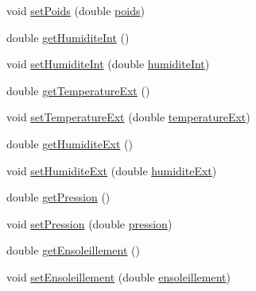 \begin{DoxyCompactItemize}
\item 
void \hyperlink{classfr_1_1campus_1_1laurainc_1_1honeybee_1_1_ruche_a0d85ef1bc9f53591e6cf0cc8667fbe2d}{set\+Poids} (double \hyperlink{classfr_1_1campus_1_1laurainc_1_1honeybee_1_1_ruche_a9e4ace1f74bc297cb50e99643203367b}{poids})
\item 
double \hyperlink{classfr_1_1campus_1_1laurainc_1_1honeybee_1_1_ruche_ab4f2b99dbdcb4cfcb81827f294ffeb4a}{get\+Humidite\+Int} ()
\item 
void \hyperlink{classfr_1_1campus_1_1laurainc_1_1honeybee_1_1_ruche_a1a5bbd259b54c895833c9e3710d2eead}{set\+Humidite\+Int} (double \hyperlink{classfr_1_1campus_1_1laurainc_1_1honeybee_1_1_ruche_ad56a25b2e432592a20a5f7f4347f92f9}{humidite\+Int})
\item 
double \hyperlink{classfr_1_1campus_1_1laurainc_1_1honeybee_1_1_ruche_ac42e5846fb470d9ac9112c20c8679980}{get\+Temperature\+Ext} ()
\item 
void \hyperlink{classfr_1_1campus_1_1laurainc_1_1honeybee_1_1_ruche_a5f3aa639b62e7bebcec6532be378964d}{set\+Temperature\+Ext} (double \hyperlink{classfr_1_1campus_1_1laurainc_1_1honeybee_1_1_ruche_aabdc13a8650aed77ee5497236e79174b}{temperature\+Ext})
\item 
double \hyperlink{classfr_1_1campus_1_1laurainc_1_1honeybee_1_1_ruche_a8e3b05a40fa1a699b7ffc1d15a7f6e31}{get\+Humidite\+Ext} ()
\item 
void \hyperlink{classfr_1_1campus_1_1laurainc_1_1honeybee_1_1_ruche_a7d9bd771e570edc523ae02fe574676f3}{set\+Humidite\+Ext} (double \hyperlink{classfr_1_1campus_1_1laurainc_1_1honeybee_1_1_ruche_affacf72018828f470b5c69c1cc4f06a6}{humidite\+Ext})
\item 
double \hyperlink{classfr_1_1campus_1_1laurainc_1_1honeybee_1_1_ruche_a9d94748ece29463c420e93e0e7aa7acd}{get\+Pression} ()
\item 
void \hyperlink{classfr_1_1campus_1_1laurainc_1_1honeybee_1_1_ruche_a149083353b1430ef67fef5de226f8947}{set\+Pression} (double \hyperlink{classfr_1_1campus_1_1laurainc_1_1honeybee_1_1_ruche_a73ddf7686cdd056fe7dc4b249f6ada86}{pression})
\item 
double \hyperlink{classfr_1_1campus_1_1laurainc_1_1honeybee_1_1_ruche_a18a40461d368f06fd0532bfa1b63b868}{get\+Ensoleillement} ()
\item 
void \hyperlink{classfr_1_1campus_1_1laurainc_1_1honeybee_1_1_ruche_a19b9dae9928c6d8267c7c7c7ca3375aa}{set\+Ensoleillement} (double \hyperlink{classfr_1_1campus_1_1laurainc_1_1honeybee_1_1_ruche_aebfc51ed0e12be0dddc7675884a8129b}{ensoleillement})

\end{DoxyCompactItemize}

